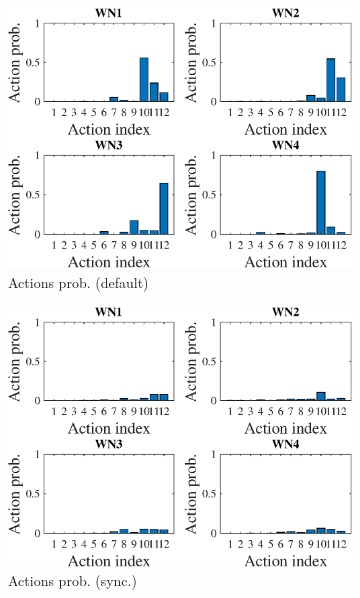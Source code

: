\documentclass[preprint,12pt]{article}
\begin{document}
\begin{figure}[h!]
	\centering
	\begin{subfigure}[b]{.3\textwidth}
		\includegraphics[width=\textwidth]{images/actions_probability_EG}
		\caption{Actions prob. (default)}\label{fig:hist_actions_EG}
	\end{subfigure}
	\begin{subfigure}[b]{.3\textwidth}
		\includegraphics[width=\textwidth]{images/actions_probability_CEG}
		\caption{Actions prob. (sync.)}\label{fig:hist_actions_CEG}
	\end{subfigure}\\
	\begin{subfigure}[b]{.3\textwidth}

\end{subfigure}
\end{figure}
\end{document}
